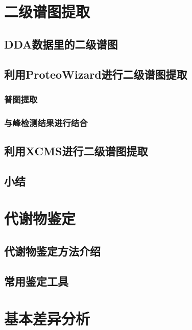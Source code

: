 \documentclass[]{ctexbook}
\begin{document}
\hypertarget{chapMSMS}{%
\chapter{二级谱图提取}\label{chapMSMS}}

\hypertarget{dda}{%
\section{DDA数据里的二级谱图}\label{dda}}

\hypertarget{proteowizard}{%
\section{利用ProteoWizard进行二级谱图提取}\label{proteowizard}}

\subsection{普图提取}

\subsection{与峰检测结果进行结合}

\hypertarget{xcms}{%
\section{利用XCMS进行二级谱图提取}\label{xcms}}

\hypertarget{-1}{%
\section{小结}\label{-1}}

\hypertarget{chapID}{%
\chapter{代谢物鉴定}\label{chapID}}

\section{代谢物鉴定方法介绍}

\section{常用鉴定工具}

\hypertarget{chapSTAT}{%
\chapter{基本差异分析}\label{chapSTAT}}
\end{document}
